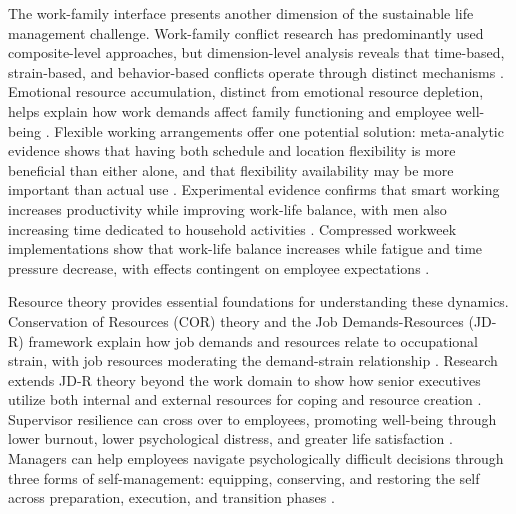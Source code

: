 \documentclass[preprint,review,11pt]{elsarticle}
\begin{document}
The work-family interface presents another dimension of the sustainable life management challenge. Work-family conflict research has predominantly used composite-level approaches, but dimension-level analysis reveals that time-based, strain-based, and behavior-based conflicts operate through distinct mechanisms \citep{hetrick_theoretical_2023}. Emotional resource accumulation, distinct from emotional resource depletion, helps explain how work demands affect family functioning and employee well-being \citep{ilies_emotional_2020}. Flexible working arrangements offer one potential solution: meta-analytic evidence shows that having both schedule and location flexibility is more beneficial than either alone, and that flexibility availability may be more important than actual use \citep{harrop_meta_2025}. Experimental evidence confirms that smart working increases productivity while improving work-life balance, with men also increasing time dedicated to household activities \citep{angelici_smart_2024}. Compressed workweek implementations show that work-life balance increases while fatigue and time pressure decrease, with effects contingent on employee expectations \citep{mühl_you_2024}.

Resource theory provides essential foundations for understanding these dynamics. Conservation of Resources (COR) theory and the Job Demands-Resources (JD-R) framework explain how job demands and resources relate to occupational strain, with job resources moderating the demand-strain relationship \citep{ghanayem_occupational_2020}. Research extends JD-R theory beyond the work domain to show how senior executives utilize both internal and external resources for coping and resource creation \citep{duan_extending_2024}. Supervisor resilience can cross over to employees, promoting well-being through lower burnout, lower psychological distress, and greater life satisfaction \citep{brady_supervisor_2025}. Managers can help employees navigate psychologically difficult decisions through three forms of self-management: equipping, conserving, and restoring the self across preparation, execution, and transition phases \citep{molinsky_how_2023}.
\end{document}
